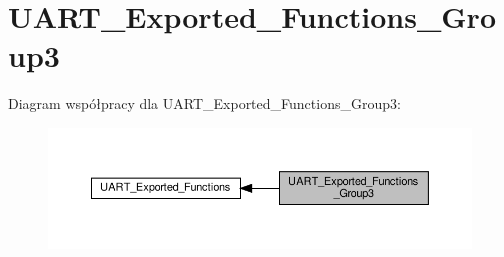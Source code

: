 \hypertarget{group___u_a_r_t___exported___functions___group3}{}\section{U\+A\+R\+T\+\_\+\+Exported\+\_\+\+Functions\+\_\+\+Group3}
\label{group___u_a_r_t___exported___functions___group3}
Diagram współpracy dla U\+A\+R\+T\+\_\+\+Exported\+\_\+\+Functions\+\_\+\+Group3\+:\nopagebreak
\begin{figure}[H]
\begin{center}
\leavevmode
\includegraphics[width=350pt]{group___u_a_r_t___exported___functions___group3}
\end{center}
\end{figure}
